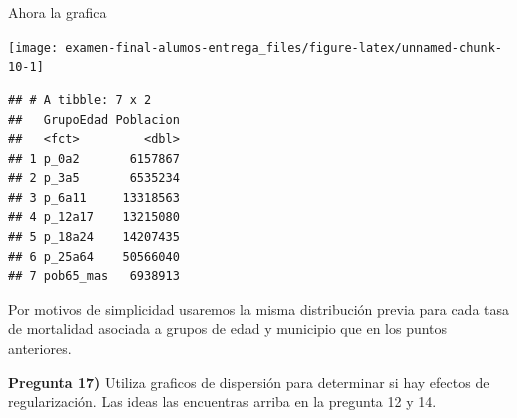 \documentclass[
]{article}
\newenvironment{Shaded}{\begin{snugshade}}{\end{snugshade}}
\newcommand{\DataTypeTok}[1]{\textcolor[rgb]{0.13,0.29,0.53}{#1}}
\newcommand{\DecValTok}[1]{\textcolor[rgb]{0.00,0.00,0.81}{#1}}
\newcommand{\KeywordTok}[1]{\textcolor[rgb]{0.13,0.29,0.53}{\textbf{#1}}}
\newcommand{\NormalTok}[1]{#1}
\newcommand{\OperatorTok}[1]{\textcolor[rgb]{0.81,0.36,0.00}{\textbf{#1}}}
\newcommand{\StringTok}[1]{\textcolor[rgb]{0.31,0.60,0.02}{#1}}
\begin{document}
Ahora la grafica

\begin{Shaded}
\end{Shaded}

\begin{center}\texttt{[image: examen-final-alumos-entrega\_files/figure-latex/unnamed-chunk-10-1]} \end{center}

\begin{Shaded}
\end{Shaded}

\begin{verbatim}
## # A tibble: 7 x 2
##   GrupoEdad Poblacion
##   <fct>         <dbl>
## 1 p_0a2       6157867
## 2 p_3a5       6535234
## 3 p_6a11     13318563
## 4 p_12a17    13215080
## 5 p_18a24    14207435
## 6 p_25a64    50566040
## 7 pob65_mas   6938913
\end{verbatim}

Por motivos de simplicidad usaremos la misma distribución previa para
cada tasa de mortalidad asociada a grupos de edad y municipio que en los
puntos anteriores.

\textbf{Pregunta 17)} Utiliza graficos de dispersión para determinar si
hay efectos de regularización. Las ideas las encuentras arriba en la
pregunta 12 y 14.

\begin{Shaded}
\end{Shaded}
\end{document}
